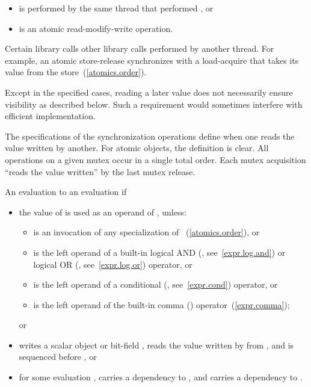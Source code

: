 \begin{itemize}
\item is performed by the same thread that performed , or
\item is an atomic read-modify-write operation.
\end{itemize}

\pnum
Certain library calls  other library calls performed by
another thread. For example, an atomic store-release synchronizes with a
load-acquire that takes its value from the store~(\ref{atomics.order}).
\begin{note} Except in the specified cases, reading a later value does not
necessarily ensure visibility as described below. Such a requirement would
sometimes interfere with efficient implementation. \end{note} \begin{note} The
specifications of the synchronization operations define when one reads the value
written by another. For atomic objects, the definition is clear. All operations
on a given mutex occur in a single total order. Each mutex acquisition ``reads
the value written'' by the last mutex release. \end{note}

\pnum
An evaluation   to an evaluation  if

\begin{itemize}

\item
the value of  is used as an operand of , unless:
\begin{itemize}

\item
{} is an invocation of any specialization of
~(\ref{atomics.order}), or

\item
{} is the left operand of a built-in logical AND (\tcode{\&\&},
see~\ref{expr.log.and}) or logical OR (\tcode{||}, see~\ref{expr.log.or}) 
operator, or

\item
{} is the left operand of a conditional (, see~\ref{expr.cond})
operator, or

\item
{} is the left operand of the built-in comma (\tcode{,})
operator~(\ref{expr.comma}); \end{itemize} or

\item
{} writes a scalar object or bit-field ,  reads the value
written by  from , and  is sequenced before , or

\item
for some evaluation ,  carries a dependency to , and 
 carries a dependency to .

\end{itemize}

